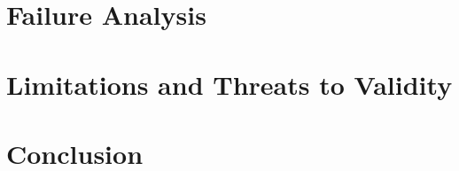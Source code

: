 \documentclass[conference]{IEEEtran}
\begin{document}
\section{Failure Analysis}

\section{Limitations and Threats to Validity}

\section{Conclusion}



\end{document}
